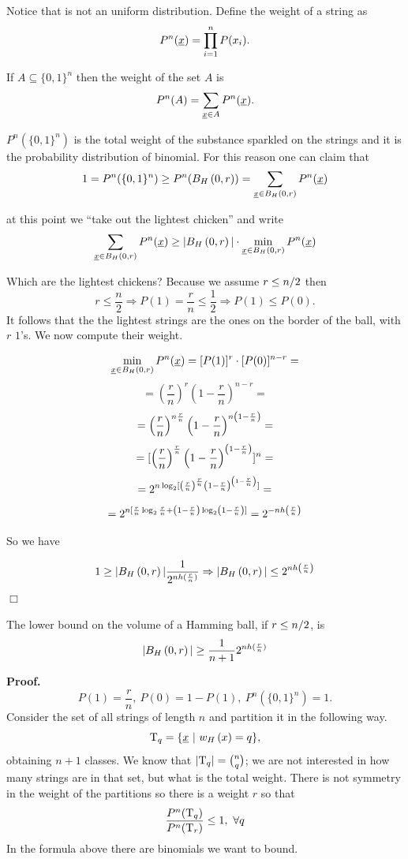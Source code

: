Notice that is not an uniform distribution. Define the weight of a string as
$$P^n(\underline{x}) = \prod_{i = 1}^n P(x_i).$$

If $A \subseteq \{0, 1\}^n$ then the weight of the set $A$ is $$P^n(A) = \sum_{\underline{x} \in A} P^n(\underline{x}).$$

$P^n(\{0, 1\}^n)$ is the total weight of the substance sparkled on the strings and it is the probability distribution of binomial. For this reason one can claim that
$$1 = P^n(\{0, 1\}^n) \geq P^n(B_H\left(0, r\right)) = \sum_{\underline{x} \in B_H\left(0, r\right)} P^n(\underline{x})$$

at this point we ``take out the lightest chicken'' and write
$$\sum_{\underline{x} \in B_H\left(0, r\right)} P^n(\underline{x}) \geq |B_H\left(0, r\right)| \cdot \min_{\underline{x} \in B_H\left(0, r\right)}P^n(\underline{x})$$

Which are the lightest chickens? Because we assume $r \leq {n}/{2}$ then
$$r \leq \dfrac{n}{2} \Rightarrow P(1) = \dfrac{r}{n} \leq \dfrac{1}{2} \Rightarrow P(1) \leq P(0).$$
It follows that the the lightest strings are the ones on the border of the ball, with $r$ $1$'s. We now compute their weight.

\[\min_{\underline{x} \in B_H\left(0, r\right)}P^n(\underline{x}) = [P(1)]^r\cdot[P(0)]^{n-r} = \] 
\[ = \left(\dfrac{r}{n}\right)^r \left(1 - \dfrac{r}{n}\right)^{n-r} = \]  \[ = \left(\dfrac{r}{n}\right)^{n\frac{r}{n}} \left(1 - \dfrac{r}{n}\right)^{n\left(1 - \frac{r}{n}\right)} =\]
\[ = [\left(\dfrac{r}{n}\right)^{\frac{r}{n}} \left(1 - \dfrac{r}{n}\right)^{\left(1 - \frac{r}{n}\right)}]^n =\] 
\[ =2^{n\log_2[\left(\frac{r}{n}\right)^{\frac{r}{n}}  \left(1 - \frac{r}{n}\right)^{\left(1 - \frac{r}{n}\right)}]} = \]
\[ =2^{n[\frac{r}{n}\log_2\frac{r}{n} + \left(1 - \frac{r}{n}\right)\log_2\left(1 - \frac{r}{n}\right)]} = 2^{-nh\left(\frac{r}{n}\right)}\]

So we have 

\[1 \geq |B_H\left(0, r\right)| \dfrac{1}{2^{nh(\frac{r}{n})}} \Rightarrow |B_H\left(0, r\right)| \leq 2^{nh\left(\frac{r}{n}\right)}\] 
\hfill$\Box$


\begin{thm}
	The lower bound on the volume of a Hamming ball, if $ r \leq {n}/{2}$, is
	$$|B_H\left(0, r\right)| \geq \dfrac{1}{n+1}2^{nh(\frac{r}{n})}$$
\end{thm}

\noindent\textbf{Proof.} $$P(1) = \dfrac{r}{n},\ P(0) = 1 - P(1),\ P^n(\{0, 1\}^n) = 1.$$
Consider the set of all strings of length $n$ and partition it in the following way.
$$\mathrm{T}_q = \{\underline{x}\ |\ w_H\left(x\right) = q\},$$
obtaining $n +1$ classes. 
We know that $|\mathrm{T}_q| = \binom{n}{q}$; we are not interested in how many strings are in that set, but what is the total weight.
There is not symmetry in the weight of the partitions so there is a weight $r$ so that
$$ \dfrac{P^n(\mathrm{T}_q)}{P^n(\mathrm{T}_r)} \leq 1,\ \forall q$$
In the formula above there are binomials we want to bound.

